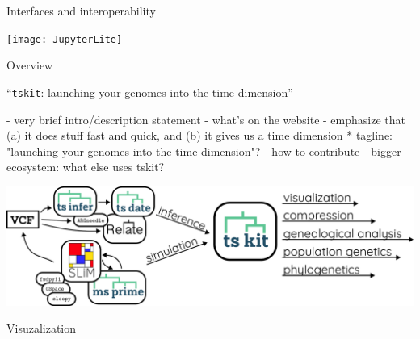 \documentclass[landscape,a0paper,fontscale=0.4]{baposter}
\newcommand{\tskit}{{\texttt{tskit}}}
\begin{document}
\begin{poster}
\begin{posterbox}[name=interop,column=0,row=0,span=1,below=inout]{Interfaces and interoperability}
% 

    \texttt{[image: JupyterLite]}

\end{posterbox}

\begin{posterbox}[name=overview,column=1,row=0,span=2]{Overview}

    \begin{center}
        \huge
        ``\tskit{}: launching your genomes into the time dimension''
    \end{center}

- very brief intro/description statement
- what's on the website
- emphasize that (a) it does stuff fast and quick, and (b) it gives us a time dimension
    * tagline: "launching your genomes into the time dimension"?
- how to contribute
- bigger ecosystem: what else uses tskit?

\includegraphics[width=\textwidth]{workflow}


\end{posterbox}

\begin{posterbox}[name=viz,column=1,row=0,span=2,below=overview]{Visuzalization}


\end{posterbox}
\end{poster}
\end{document}
